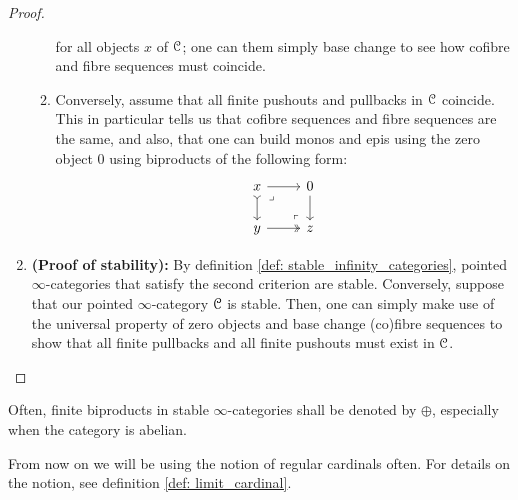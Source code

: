 \begin{proof}
\begin{enumerate}
\begin{enumerate}
$$                                    $$
                                for all objects $x$ of $\mathcal{C}$; one can them simply base change to see how cofibre and fibre sequences must coincide.
                                \item Conversely, assume that all finite pushouts and pullbacks in $\mathcal{C}$ coincide. This in particular tells us that cofibre sequences and fibre sequences are the same, and also, that one can build monos and epis using the zero object $0$ using biproducts of the following form:
                                    $$
                                        \begin{tikzcd}
                                            x & 0 \\
                                            y & z
                                            \arrow[from=1-2, to=2-2]
                                            \arrow[two heads, from=2-1, to=2-2]
                                            \arrow[tail, from=1-1, to=2-1]
                                            \arrow[from=1-1, to=1-2]
                                            \arrow["\lrcorner"{anchor=center, pos=0.125}, draw=none, from=1-1, to=2-2]
                                            \arrow["\lrcorner"{anchor=center, pos=0.125, rotate=180}, draw=none, from=2-2, to=1-1]
                                        \end{tikzcd}
                                    $$
                            \end{enumerate}
                        \item \textbf{(Proof of stability):} By definition \ref{def: stable_infinity_categories}, pointed $\infty$-categories that satisfy the second criterion are stable. Conversely, suppose that our pointed $\infty$-category $\mathcal{C}$ is stable. Then, one can simply make use of the universal property of zero objects and base change (co)fibre sequences to show that all finite pullbacks and all finite pushouts must exist in $\mathcal{C}$. 
                    \end{enumerate}
                \end{proof}
            \begin{convention}
                Often, finite biproducts in stable $\infty$-categories shall be denoted by $\oplus$, especially when the category is abelian.
            \end{convention}  
            
            \begin{remark}
                From now on we will be using the notion of regular cardinals often. For details on the notion, see definition \ref{def: limit_cardinal}.
            \end{remark}
            
